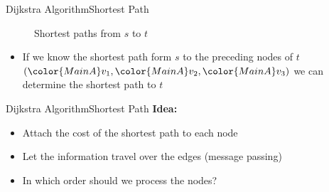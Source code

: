 
\begin{frame}{Dijkstra Algorithm}{Shortest Path}
  \begin{figure}%
    \begin{adjustbox}{width=0.75\linewidth}%
    \end{adjustbox}%
    \vspace{-1.0em}
    \label{fig:dijkstra:shortest_paths_introduction}%
    \caption{Shortest paths from {\color{MainA}$s$} to
      {\color{MainA}$t$}}
  \end{figure}
  \vspace{-1.0em}
  \begin{itemize}
    \item
      If we know the shortest path form {\color{MainA}$s$}
      to the preceding nodes of {\color{MainA}$t$}
      \begin{math}
        (
          {\color{MainA}v_1},
          {\color{MainA}v_2},
          {\color{MainA}v_3}
        )
       \end{math}
       we can determine the shortest path to {\color{MainA}$t$}
   \end{itemize}
\end{frame}


\begin{frame}{Dijkstra Algorithm}{Shortest Path}
  \textbf{Idea:}
  \begin{itemize}
    \item
      Attach the cost of the shortest path to each node
    \item
      Let the information travel over the edges (message passing)
    \item
      In which order should we process the nodes?
  \end{itemize}
\end{frame}


